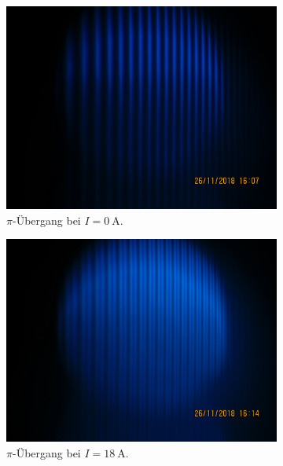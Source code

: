 \begin{figure}
  \centering
  \begin{subfigure}{.49\textwidth}
    \centering
    \includegraphics[width=\textwidth]{rohdaten/blau_pi_0A.JPG}
    \caption{$\pi$-Übergang bei $I = \SI{0}{\ampere}.$}
  \end{subfigure}
  \begin{subfigure}{.49\textwidth}
    \centering
    \includegraphics[width=\textwidth]{rohdaten/blau_pi_18A.JPG}
    \caption{$\pi$-Übergang bei $I = \SI{18}{\ampere}.$}
  \end{subfigure}
  \\
  \begin{subfigure}{.49\textwidth}
    \centering

\end{subfigure}
\end{figure}
